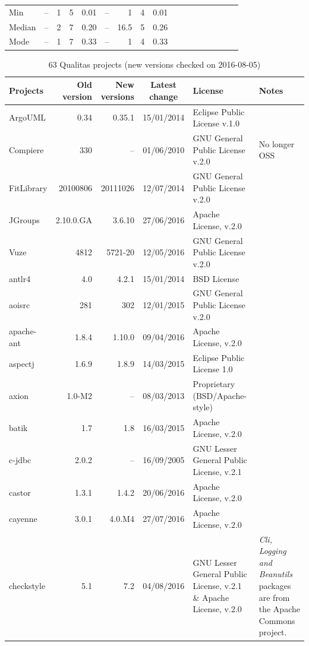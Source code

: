 \documentclass{IEEEtran}
\begin{document}
\begin{table}[h]
{\begin{tabular}{l|r|r|r|r|r|r|r|r|r|r|r|r|r|r|r|r}
			Min 	& -- 	& 1 	& 5 	& 0.01 	& -- 	& 1 		& 4 	& 0.01 \\ %
			Median 	& -- 	& 2 	& 7 	& 0.20 	& -- 	& 16.5 		& 5 	& 0.26 \\ %
			Mode 	& -- 	& 1 	& 7 	& 0.33 	& -- 	& 1 		& 4 	& 0.33 \\ %
			\hline
		\end{tabular} %
	}
\end{table}

\begin{table}[H]
	\centering
	\caption{63 Qualitas projects (new versions checked on 2016-08-05)}
	\label{t:new_and_old}
\begin{tabular}{l|r|r|c|p{5cm}|p{3cm}}
	\hline 
	Projects & Old version & New versions & Latest change & License & Notes \\
	\hline
	ArgoUML & 0.34 & 0.35.1 & 15/01/2014 & Eclipse Public License v.1.0 \\
	Compiere & 330 & -- & 01/06/2010 &  GNU General Public License v.2.0 & No longer OSS \\
	FitLibrary & 20100806 & 20111026 & 12/07/2014 & GNU General Public License v.2.0 \\
	JGroups & 2.10.0.GA & 3.6.10 & 27/06/2016  & Apache License, v.2.0 \\
	Vuze & 4812 & 5721-20 & 12/05/2016 & GNU General Public License v.2.0 &  \\
	antlr4 & 4.0 & 4.2.1 & 15/01/2014 & BSD License \\
	aoisrc & 281 & 302 & 12/01/2015 &  GNU General Public License v.2.0 \\
	apache-ant & 1.8.4 & 1.10.0 & 09/04/2016 & Apache License, v.2.0 \\
	aspectj & 1.6.9 & 1.8.9 & 14/03/2015 & Eclipse Public License 1.0 \\
	axion & 1.0-M2 & -- & 08/03/2013 & Proprietary (BSD/Apache-style) \\
	batik & 1.7 & 1.8 & 16/03/2015 & Apache License, v.2.0 \\
	c-jdbc & 2.0.2 & -- & 16/09/2005 & GNU Lesser General Public License, v.2.1 \\
	castor & 1.3.1 & 1.4.2 & 20/06/2016 & Apache License, v.2.0 \\
	cayenne & 3.0.1 & 4.0.M4 &  27/07/2016 & Apache License, v.2.0 \\
	checkstyle & 5.1 & 7.2  & 04/08/2016 & GNU Lesser General Public License, v.2.1 \& Apache License, v.2.0 & \textit{Cli, Logging and Beanutils} packages are from the Apache Commons project. \\

\end{tabular}
\end{table}
\end{document}
